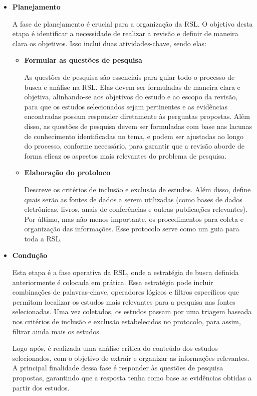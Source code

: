 \begin{itemize}
	\item \textbf{Planejamento}

A fase de planejamento é crucial para a organização da RSL. O objetivo desta etapa é identificar a necessidade de realizar a revisão e definir de maneira clara os objetivos. Isso inclui duas atividades-chave, sendo elas:

\begin{itemize}
	\item \textbf{Formular as questões de pesquisa}
	
		As questões de pesquisa são essenciais para guiar todo o processo de busca e análise na RSL. Elas devem ser formuladas de maneira clara e objetiva, alinhando-se aos objetivos do estudo e ao escopo da revisão, para que os estudos selecionados sejam pertinentes e as evidências encontradas possam responder diretamente às perguntas propostas. Além disso, as questões de pesquisa devem ser formuladas com base nas lacunas de conhecimento identificadas no tema, e podem ser ajustadas ao longo do processo, conforme necessário, para garantir que a revisão aborde de forma eficaz os aspectos mais relevantes do problema de pesquisa.
	
	\item \textbf{Elaboração do protoloco}
	
		 Descreve os critérios de inclusão e exclusão de estudos. Além disso, define quais serão as fontes de dados a serem utilizadas (como bases de dados eletrônicas, livros, anais de conferências e outras publicações relevantes). Por último, mas não menos importante, os procedimentos para coleta e organização das informações. Esse protocolo serve como um guia para toda a RSL.
\end{itemize}

	\item \textbf{Condução}
	
	Esta etapa é a fase operativa da RSL, onde a estratégia de busca definida anteriormente é colocada em prática. Essa estratégia pode incluir combinações de palavras-chave, operadores lógicos e filtros específicos que permitam localizar os estudos mais relevantes para a pesquisa nas fontes selecionadas. Uma vez coletados, os estudos passam por uma triagem baseada nos critérios de inclusão e exclusão estabelecidos no protocolo, para assim, filtrar ainda mais os estudos.
	
	Logo após, é realizada uma análise crítica do conteúdo dos estudos selecionados, com o objetivo de extrair e organizar as informações relevantes. A principal finalidade dessa fase é responder às questões de pesquisa propostas, garantindo que a resposta tenha como base as evidências obtidas a partir dos estudos.
	

\end{itemize}
